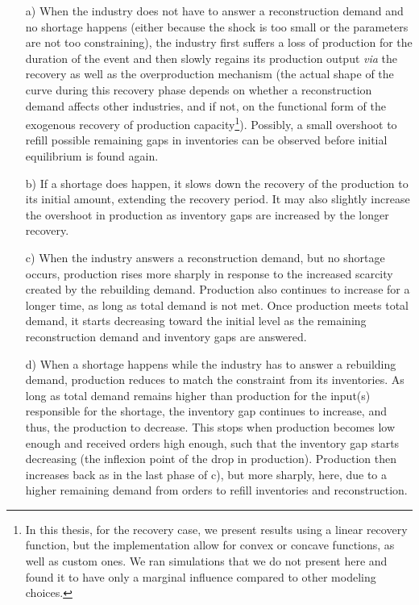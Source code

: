 \documentclass[main.tex]{subfiles}
\begin{document}
\begin{enumerate}
\item[a)] When the industry does not have to answer a reconstruction demand and
  no shortage happens (either because the shock is too small or the parameters
  are not too constraining), the industry first suffers a loss of production for the
  duration of the event and then slowly regains its production output \emph{via} the
  recovery as well as the overproduction mechanism (the actual shape of the
  curve during this recovery phase depends on whether a reconstruction demand
  affects other industries, and if not, on the functional form of the exogenous
  recovery of production capacity\footnote{In this thesis, for the recovery case, we present results
    using a linear recovery function, but the implementation allow for convex or
    concave functions, as well as custom ones. We ran simulations that we do not
    present here and found it to have only a marginal influence compared to
    other modeling choices.}). Possibly, a small overshoot to refill possible
  remaining gaps in inventories can be observed before initial equilibrium is found again.
\item[b)] If a shortage does happen, it slows down the recovery of the production
  to its initial amount, extending the recovery period. It
  may also slightly increase the overshoot in production as inventory
  gaps are increased by the longer recovery.
\item[c)] When the industry answers a reconstruction demand, but no shortage occurs,
  production rises more sharply in response to the increased scarcity created
  by the rebuilding demand. Production also continues to increase for a longer time, as
  long as total demand is not met. Once production meets total demand, it starts
  decreasing toward the initial level as the remaining reconstruction demand and
  inventory gaps are answered.
\item[d)] When a shortage happens while the industry has to answer a rebuilding
  demand, production reduces to match the constraint from its inventories.
  As long as total demand remains higher than production for the input(s)
  responsible for the shortage, the inventory gap continues to increase,
  and thus, the production to decrease. This stops when production becomes low enough
  and received orders high enough, such that the inventory gap starts decreasing
  (the inflexion point of the drop in production).
  Production then increases back as in the last phase of c), but more sharply, here,
  due to a higher remaining demand from orders to refill inventories and reconstruction.
\end{enumerate}
\end{document}

